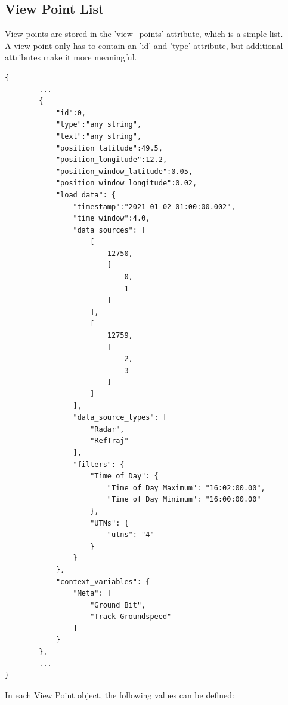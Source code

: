 \subsection{View Point List}

View points are stored in the 'view\_points' attribute, which is a simple list. \\

A view point only has to contain an 'id' and 'type' attribute, but additional attributes make it more meaningful.

\begin{lstlisting}[basicstyle=\small\ttfamily]
{
        ...
        {
            "id":0,
            "type":"any string",
            "text":"any string",
            "position_latitude":49.5,
            "position_longitude":12.2,
            "position_window_latitude":0.05,
            "position_window_longitude":0.02,
            "load_data": {
                "timestamp":"2021-01-02 01:00:00.002",
                "time_window":4.0,
                "data_sources": [
                    [
                        12750,
                        [
                            0,
                            1
                        ]
                    ],
                    [
                        12759,
                        [
                            2,
                            3
                        ]
                    ]
                ],
                "data_source_types": [
                    "Radar",
                    "RefTraj"
                ],
                "filters": {
                    "Time of Day": {
                        "Time of Day Maximum": "16:02:00.00",
                        "Time of Day Minimum": "16:00:00.00"
                    },
                    "UTNs": {
                        "utns": "4"
                    }
                }
            },
            "context_variables": {
                "Meta": [
                    "Ground Bit",
                    "Track Groundspeed"
                ]
            }
        },
        ...
}
\end{lstlisting}

In each View Point object, the following values can be defined:

